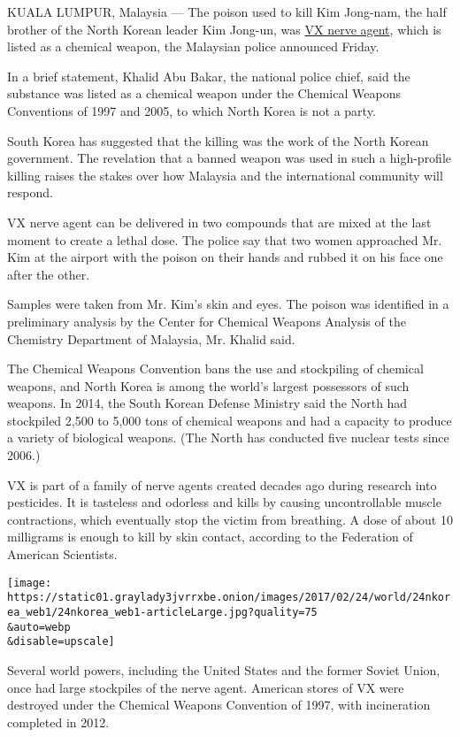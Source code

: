 KUALA LUMPUR, Malaysia --- The poison used to kill Kim Jong-nam, the
half brother of the North Korean leader Kim Jong-un, was
\href{https://www.nytimes3xbfgragh.onion/2017/02/24/world/asia/vx-nerve-agent-kim-jong-nam.html}{VX
nerve agent}, which is listed as a chemical weapon, the Malaysian police
announced Friday.

In a brief statement, Khalid Abu Bakar, the national police chief, said
the substance was listed as a chemical weapon under the Chemical Weapons
Conventions of 1997 and 2005, to which North Korea is not a party.

South Korea has suggested that the killing was the work of the North
Korean government. The revelation that a banned weapon was used in such
a high-profile killing raises the stakes over how Malaysia and the
international community will respond.

VX nerve agent can be delivered in two compounds that are mixed at the
last moment to create a lethal dose. The police say that two women
approached Mr. Kim at the airport with the poison on their hands and
rubbed it on his face one after the other.

Samples were taken from Mr. Kim's skin and eyes. The poison was
identified in a preliminary analysis by the Center for Chemical Weapons
Analysis of the Chemistry Department of Malaysia, Mr. Khalid said.

The Chemical Weapons Convention bans the use and stockpiling of chemical
weapons, and North Korea is among the world's largest possessors of such
weapons. In 2014, the South Korean Defense Ministry said the North had
stockpiled 2,500 to 5,000 tons of chemical weapons and had a capacity to
produce a variety of biological weapons. (The North has conducted five
nuclear tests since 2006.)

VX is part of a family of nerve agents created decades ago during
research into pesticides. It is tasteless and odorless and kills by
causing uncontrollable muscle contractions, which eventually stop the
victim from breathing. A dose of about 10 milligrams is enough to kill
by skin contact, according to the Federation of American Scientists.

\texttt{[image: https://static01.graylady3jvrrxbe.onion/images/2017/02/24/world/24nkorea\_web1/24nkorea\_web1-articleLarge.jpg?quality=75\\\&auto=webp\\\&disable=upscale]}

Several world powers, including the United States and the former Soviet
Union, once had large stockpiles of the nerve agent. American stores of
VX were destroyed under the Chemical Weapons Convention of 1997, with
incineration completed in 2012.

